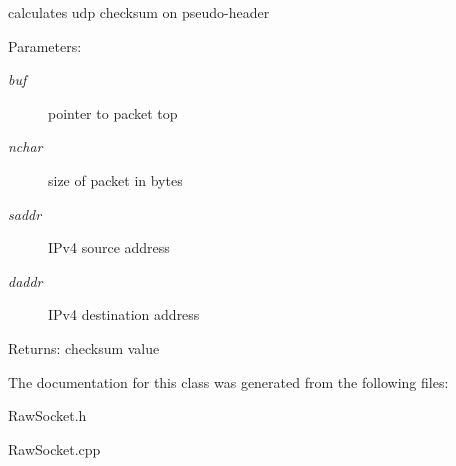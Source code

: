 calculates udp checksum on pseudo-header 

\begin{Desc}
\item[Parameters:]
\begin{description}
\item[{\em buf}]pointer to packet top \item[{\em nchar}]size of packet in bytes \item[{\em saddr}]IPv4 source address \item[{\em daddr}]IPv4 destination address \end{description}
\end{Desc}
\begin{Desc}
\item[Returns:]checksum value \end{Desc}


The documentation for this class was generated from the following files:\begin{CompactItemize}
\item 
RawSocket.h\item 
RawSocket.cpp\end{CompactItemize}
